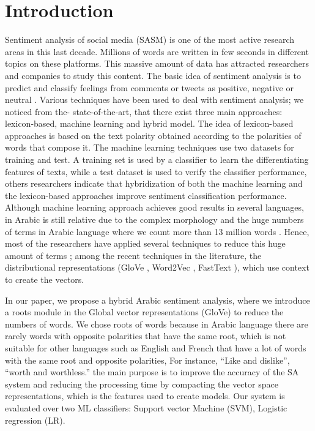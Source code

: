 \documentclass[conference]{IEEEtran}
\begin{document}
\section{Introduction}
Sentiment analysis of social media (SASM) is one of the most active research areas in this last decade. Millions of words are written in few seconds in different topics on these platforms. This massive amount of data has attracted researchers and companies to study this content. The basic idea of sentiment analysis is to predict and classify feelings from comments or tweets as positive, negative or neutral \cite{7351837}.
Various techniques have been used to deal with sentiment analysis; we noticed from the- state-of-the-art, that there exist three main approaches: lexicon-based\cite{8673428}, machine learning\cite{8392100} and hybrid model\cite{8250273}. The idea of lexicon-based approaches is based on the text polarity obtained according to the polarities of words that compose it. The machine learning techniques use two datasets for training and test. A training set is used by a classifier to learn the differentiating features of texts, while a test dataset is used to verify the classifier performance, others researchers indicate that hybridization of both the machine learning and the lexicon-based approaches improve sentiment classification performance.
Although machine learning approach achieves good results in several languages, in Arabic is still relative due to the complex morphology and the huge numbers of terms in Arabic language where we count more than 13 million words \cite{8067771}. Hence, most of the researchers have applied several techniques to reduce this huge amount of terms \cite{8098736} \cite{8500193}; among the recent techniques in the literature, the distributional representations (GloVe \cite{8324059}, Word2Vec \cite{8480191}, FastText \cite{8258460}), which use context to create the vectors.

In our paper, we propose a hybrid Arabic sentiment analysis, where we introduce a roots module in the Global vector representations (GloVe) to reduce the numbers of words. We chose roots of words because in Arabic language there are rarely words with opposite polarities that have the same root, which is not suitable for other languages such as English and French that have a lot of words with the same root and opposite polarities, For instance, “Like and dislike”, “worth and worthless.” the main purpose is to improve the accuracy of the SA system and reducing the processing time  by compacting the vector space representations, which is the features used to create models. Our system is evaluated over two ML classifiers: Support vector Machine (SVM)\cite{6289583}, Logistic regression (LR)\cite{8284501}.  
\end{document}
